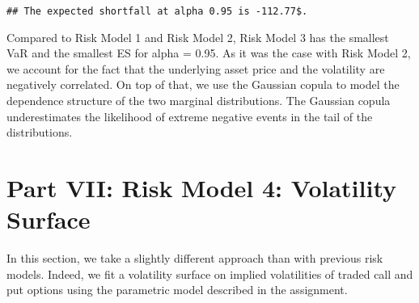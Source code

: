 \documentclass[]{article}
\begin{document}
\begin{verbatim}
## The expected shortfall at alpha 0.95 is -112.77$.
\end{verbatim}

Compared to Risk Model 1 and Risk Model 2, Risk Model 3 has the smallest
VaR and the smallest ES for alpha = 0.95. As it was the case with Risk
Model 2, we account for the fact that the underlying asset price and the
volatility are negatively correlated. On top of that, we use the
Gaussian copula to model the dependence structure of the two marginal
distributions. The Gaussian copula underestimates the likelihood of
extreme negative events in the tail of the distributions.

\hypertarget{part-vii-risk-model-4-volatility-surface}{%
\section{Part VII: Risk Model 4: Volatility
Surface}\label{part-vii-risk-model-4-volatility-surface}}

In this section, we take a slightly different approach than with
previous risk models. Indeed, we fit a volatility surface on implied
volatilities of traded call and put options using the parametric model
described in the assignment.
\end{document}
